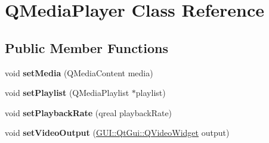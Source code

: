 \hypertarget{classGUI_1_1QtGui_1_1QMediaPlayer}{}\section{Q\+Media\+Player Class Reference}
\label{classGUI_1_1QtGui_1_1QMediaPlayer}
\subsection*{Public Member Functions}
\begin{DoxyCompactItemize}
\item 
\hypertarget{classGUI_1_1QtGui_1_1QMediaPlayer_a07dc25fd3748ef473d3a5ae3acb7167a}{}void {\bfseries set\+Media} (Q\+Media\+Content media)\label{classGUI_1_1QtGui_1_1QMediaPlayer_a07dc25fd3748ef473d3a5ae3acb7167a}

\item 
\hypertarget{classGUI_1_1QtGui_1_1QMediaPlayer_abf283c841f73368ac52a5c5cda32c4f4}{}void {\bfseries set\+Playlist} (Q\+Media\+Playlist $\ast$playlist)\label{classGUI_1_1QtGui_1_1QMediaPlayer_abf283c841f73368ac52a5c5cda32c4f4}

\item 
\hypertarget{classGUI_1_1QtGui_1_1QMediaPlayer_a4a6aeac0a431c1b7917815a82c343123}{}void {\bfseries set\+Playback\+Rate} (qreal playback\+Rate)\label{classGUI_1_1QtGui_1_1QMediaPlayer_a4a6aeac0a431c1b7917815a82c343123}

\item 
\hypertarget{classGUI_1_1QtGui_1_1QMediaPlayer_a020e1f0fd3e15697a81eb33572c303a6}{}void {\bfseries set\+Video\+Output} (\hyperlink{classGUI_1_1QtGui_1_1QVideoWidget}{G\+U\+I\+::\+Qt\+Gui\+::\+Q\+Video\+Widget} output)\label{classGUI_1_1QtGui_1_1QMediaPlayer_a020e1f0fd3e15697a81eb33572c303a6}

\end{DoxyCompactItemize}
